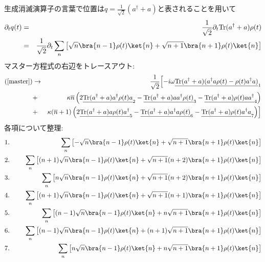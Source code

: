 \documentclass[10.5pt,a4paper]{jreport}
\begin{document}
生成消滅演算子の言葉で位置は$q = \frac{1}{\sqrt{2}}(a^\dagger + a)$と表されることを用いて
\begin{eqnarray}
  \nonumber  \partial_tq(t) &=& \frac{1}{\sqrt{2}}\partial_t{\rm Tr}(a^\dagger + a)\rho(t)\\
  &=& \frac{1}{\sqrt{2}}\partial_t\sum_n\left[\sqrt{n}\bra{n-1}\rho(t)\ket{n} + \sqrt{n+1}\bra{n+1}\rho(t)\ket{n}\right]\label{Position}
\end{eqnarray}
マスター方程式の右辺をトレースアウト:
\begin{eqnarray}
  \nonumber  (\ref{master}) &\rightarrow& \frac{1}{\sqrt{2}}\Bigl[-i\omega\underline{{\rm Tr}(a^\dagger +a)(a^\dagger a\rho(t) - \rho(t)a^\dagger a)}_1\\
    \nonumber    &+& \kappa\overline{n}\left(2\underline{{\rm Tr}(a^\dagger +a)a^\dagger \rho(t)a}_2 - \underline{{\rm Tr}(a^\dagger + a)aa^\dagger \rho(t)}_3 - \underline{{\rm Tr}(a^\dagger +a)\rho(t)aa^\dagger}_4\right)\\
    &+& \kappa(\overline{n}+1)\left(2\underline{{\rm Tr}(a^\dagger +a)a\rho(t)a^\dagger}_5 - \underline{{\rm Tr}(a^\dagger + a)a^\dagger a\rho(t)}_6 - \underline{{\rm Tr}(a^\dagger +a)\rho(t)a^\dagger a}_7\right)\Bigr]\label{position}
\end{eqnarray}
各項について整理:
\begin{eqnarray}
  &1.&\hspace{5mm}\sum_n\left[-\sqrt{n}\bra{n-1}\rho(t)\ket{n}+\sqrt{n+1}\bra{n+1}\rho(t)\ket{n}\right]\\
  &2.&\hspace{5mm}\sum_n\left[(n+1)\sqrt{n}\bra{n-1}\rho(t)\ket{n}+\sqrt{n+1}(n+2)\bra{n+1}\rho(t)\ket{n}\right]\\
  &3.&\hspace{5mm}\sum_n\left[n\sqrt{n}\bra{n-1}\rho(t)\ket{n}+\sqrt{n+1}(n+2)\bra{n+1}\rho(t)\ket{n}\right]\\
  &4.&\hspace{5mm}\sum_n\left[(n+1)\sqrt{n}\bra{n-1}\rho(t)\ket{n}+\sqrt{n+1}(n+1)\bra{n+1}\rho(t)\ket{n}\right]\\
  &5.&\hspace{5mm}\sum_n\left[(n-1)\sqrt{n}\bra{n-1}\rho(t)\ket{n}+n\sqrt{n+1}\bra{n+1}\rho(t)\ket{n}\right]\\
  &6.&\hspace{5mm}\sum_n\left[(n-1)\sqrt{n}\bra{n-1}\rho(t)\ket{n}+(n+1)\sqrt{n+1}\bra{n+1}\rho(t)\ket{n}\right]\\
  &7.&\hspace{5mm}\sum_n\left[n\sqrt{n}\bra{n-1}\rho(t)\ket{n}+n\sqrt{n+1}\bra{n+1}\rho(t)\ket{n}\right]
\end{eqnarray}
\end{document}
